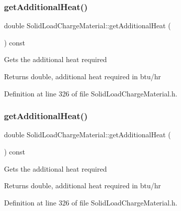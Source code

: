 \subsubsection{\texorpdfstring{get\+Additional\+Heat()}{getAdditionalHeat()}\hspace{0.1cm}{\footnotesize\ttfamily [1/3]}}
{\footnotesize\ttfamily double Solid\+Load\+Charge\+Material\+::get\+Additional\+Heat (\begin{DoxyParamCaption}{ }\end{DoxyParamCaption}) const\hspace{0.3cm}{\ttfamily [inline]}}

Gets the additional heat required \begin{DoxyReturn}{Returns}
double, additional heat required in btu/hr 
\end{DoxyReturn}


Definition at line 326 of file Solid\+Load\+Charge\+Material.\+h.

\mbox{\label{class_solid_load_charge_material_a0fde17a84b10bb75bf78227548fbf26c}} 
\subsubsection{\texorpdfstring{get\+Additional\+Heat()}{getAdditionalHeat()}\hspace{0.1cm}{\footnotesize\ttfamily [2/3]}}
{\footnotesize\ttfamily double Solid\+Load\+Charge\+Material\+::get\+Additional\+Heat (\begin{DoxyParamCaption}{ }\end{DoxyParamCaption}) const\hspace{0.3cm}{\ttfamily [inline]}}

Gets the additional heat required \begin{DoxyReturn}{Returns}
double, additional heat required in btu/hr 
\end{DoxyReturn}


Definition at line 326 of file Solid\+Load\+Charge\+Material.\+h.

\mbox{\label{class_solid_load_charge_material_a0fde17a84b10bb75bf78227548fbf26c}} 
